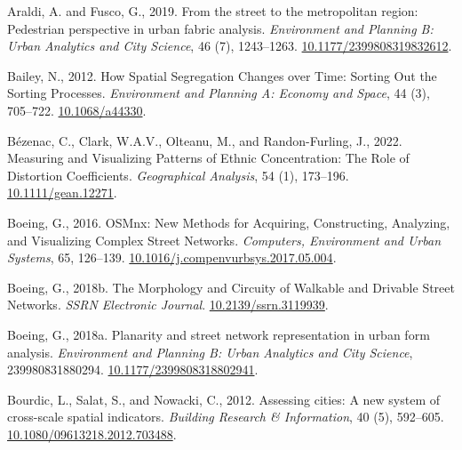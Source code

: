 \documentclass[
  10pt,
]{article}
\newlength{\cslhangindent}
\newenvironment{CSLReferences}[2] %
 {%
  \setlength{\parindent}{0pt}
  \ifodd #1 \everypar{\setlength{\hangindent}{\cslhangindent}}\ignorespaces\fi
  \ifnum #2 > 0
  \setlength{\parskip}{#2\baselineskip}
  \fi
 }%
 {}
\begin{document}
\hypertarget{refs}{}
\begin{CSLReferences}{1}{0}
\leavevmode{}%
Araldi, A. and Fusco, G., 2019. From the street to the metropolitan
region: {Pedestrian} perspective in urban fabric analysis.
\emph{Environment and Planning B: Urban Analytics and City Science}, 46
(7), 1243--1263.
\href{https://doi.org/10.1177/2399808319832612}{10.1177/2399808319832612}.

\leavevmode{}%
Bailey, N., 2012. How {Spatial Segregation Changes} over {Time}:
{Sorting Out} the {Sorting Processes}. \emph{Environment and Planning A:
Economy and Space}, 44 (3), 705--722.
\href{https://doi.org/10.1068/a44330}{10.1068/a44330}.

\leavevmode{}%
Bézenac, C., Clark, W.A.V., Olteanu, M., and Randon-Furling, J., 2022.
Measuring and {Visualizing Patterns} of {Ethnic Concentration}: {The
Role} of {Distortion Coefficients}. \emph{Geographical Analysis}, 54
(1), 173--196.
\href{https://doi.org/10.1111/gean.12271}{10.1111/gean.12271}.

\leavevmode{}%
Boeing, G., 2016. {OSMnx}: {New Methods} for {Acquiring},
{Constructing}, {Analyzing}, and {Visualizing Complex Street Networks}.
\emph{Computers, Environment and Urban Systems}, 65, 126--139.
\href{https://doi.org/10.1016/j.compenvurbsys.2017.05.004}{10.1016/j.compenvurbsys.2017.05.004}.

\leavevmode{}%
Boeing, G., 2018b. The {Morphology} and {Circuity} of {Walkable} and
{Drivable Street Networks}. \emph{SSRN Electronic Journal}.
\href{https://doi.org/10.2139/ssrn.3119939}{10.2139/ssrn.3119939}.

\leavevmode{}%
Boeing, G., 2018a. Planarity and street network representation in urban
form analysis. \emph{Environment and Planning B: Urban Analytics and
City Science}, 239980831880294.
\href{https://doi.org/10.1177/2399808318802941}{10.1177/2399808318802941}.

\leavevmode{}%
Bourdic, L., Salat, S., and Nowacki, C., 2012. Assessing cities: A new
system of cross-scale spatial indicators. \emph{Building Research \&
Information}, 40 (5), 592--605.
\href{https://doi.org/10.1080/09613218.2012.703488}{10.1080/09613218.2012.703488}.


\end{CSLReferences}
\end{document}
